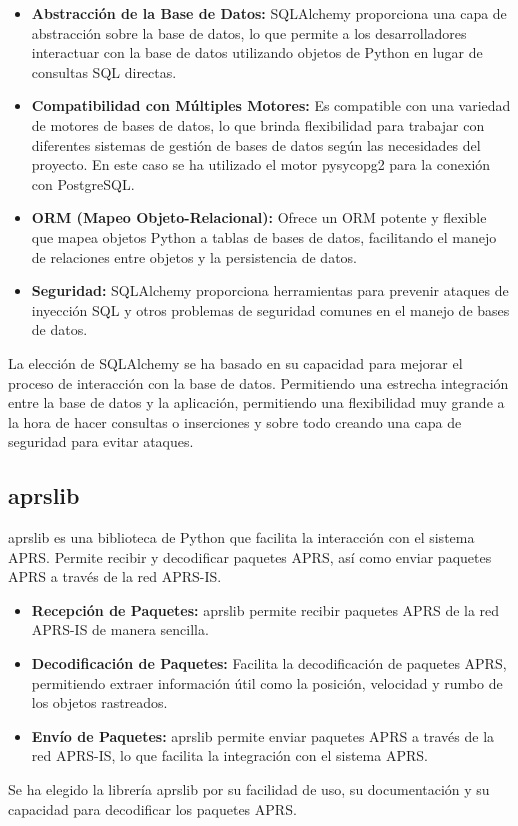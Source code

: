 \begin{itemize}
	\item \textbf{Abstracción de la Base de Datos:} SQLAlchemy proporciona una capa de abstracción sobre la base de datos, lo que permite a los desarrolladores interactuar con la base de datos utilizando objetos de Python en lugar de consultas SQL directas.
	\item \textbf{Compatibilidad con Múltiples Motores:} Es compatible con una variedad de motores de bases de datos, lo que brinda flexibilidad para trabajar con diferentes sistemas de gestión de bases de datos según las necesidades del proyecto. En este caso se ha utilizado el motor pysycopg2 para la conexión con PostgreSQL.
	\item \textbf{ORM (Mapeo Objeto-Relacional):} Ofrece un ORM potente y flexible que mapea objetos Python a tablas de bases de datos, facilitando el manejo de relaciones entre objetos y la persistencia de datos.
	\item \textbf{Seguridad:} SQLAlchemy proporciona herramientas para prevenir ataques de inyección SQL y otros problemas de seguridad comunes en el manejo de bases de datos.
\end{itemize}

La elección de SQLAlchemy se ha basado en su capacidad para mejorar el proceso de interacción con la base de datos. Permitiendo una estrecha integración entre la base de datos y la aplicación, permitiendo una flexibilidad muy grande a la hora de hacer consultas o inserciones y sobre todo creando una capa de seguridad para evitar ataques.
\subsection*{aprslib}
aprslib es una biblioteca de Python que facilita la interacción con el sistema APRS. Permite recibir y decodificar paquetes APRS, así como enviar paquetes APRS a través de la red APRS-IS.
\begin{itemize}
	\item \textbf{Recepción de Paquetes:} aprslib permite recibir paquetes APRS de la red APRS-IS de manera sencilla.
	\item \textbf{Decodificación de Paquetes:} Facilita la decodificación de paquetes APRS, permitiendo extraer información útil como la posición, velocidad y rumbo de los objetos rastreados.
	\item \textbf{Envío de Paquetes:} aprslib permite enviar paquetes APRS a través de la red APRS-IS, lo que facilita la integración con el sistema APRS.
\end{itemize}
Se ha elegido la librería aprslib por su facilidad de uso, su documentación y su capacidad para decodificar los paquetes APRS.

